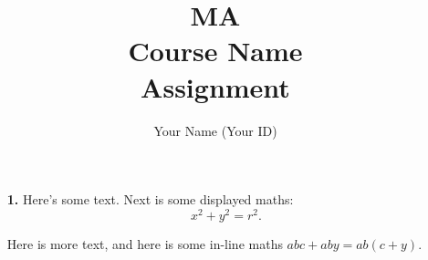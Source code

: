 \documentclass[a4paper,11pt]{article}
\begin{document}
\title{MA\\ Course Name\\ Assignment}
\date{}
\author{Your Name (Your ID)}
\clearpage\maketitle
\thispagestyle{empty}
\newpage
\clearpage
\setcounter{page}{1}
\begin{itemize}
\item[\textbf{1.}] Here's some text. Next is some displayed maths:
$$x^2 + y^2 = r^2.$$

Here is more text, and here is some in-line maths $abc + aby = ab(c+y)$.
\end{itemize}
\end{document}
